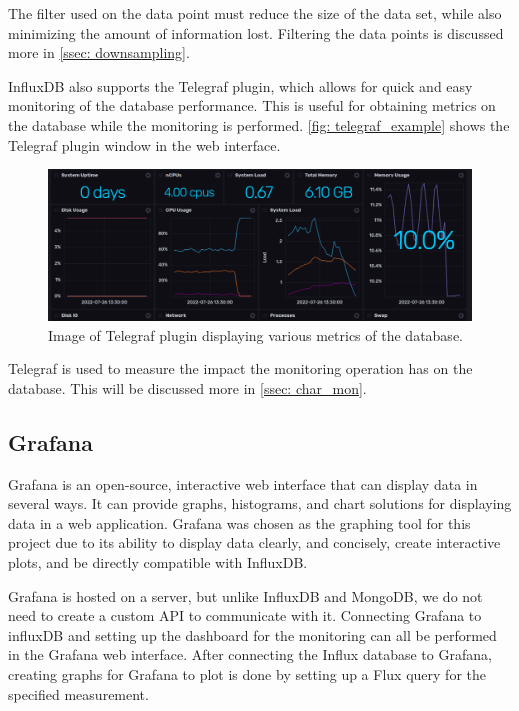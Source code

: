 \documentclass[main.tex]{subfiles}
\begin{document}
The filter used on the data point must reduce the size of the data set, while also minimizing the amount of information lost. Filtering the data points is discussed more in \autoref{ssec: downsampling}.

InfluxDB also supports the Telegraf plugin, which allows for quick and easy monitoring of the database performance. This is useful for obtaining metrics on the database while the monitoring is performed. \autoref{fig: telegraf_example} shows the Telegraf plugin window in the web interface.

\begin{figure}[!htpb]
    \centering
    \includegraphics[width=17cm, scale=4]{images/telegraf_example.png}
    \caption{Image of Telegraf plugin displaying various metrics of the database.}
    \label{fig: telegraf_example}
\end{figure}
\FloatBarrier

Telegraf is used to measure the impact the monitoring operation has on the database. This will be discussed more in \autoref{ssec: char_mon}.

\subsection{Grafana}
\label{ssec: grafana}
Grafana is an open-source, interactive web interface that can display data in several ways. It can provide graphs, histograms, and chart solutions for displaying data in a web application. Grafana was chosen as the graphing tool for this project due to its ability to display data clearly, and concisely, create interactive plots, and be directly compatible with InfluxDB.

Grafana is hosted on a server, but unlike InfluxDB and MongoDB, we do not need to create a custom API to communicate with it. Connecting Grafana to influxDB and setting up the dashboard for the monitoring can all be performed in the Grafana web interface. After connecting the Influx database to Grafana, creating graphs for Grafana to plot is done by setting up a Flux query for the specified measurement.
\end{document}
